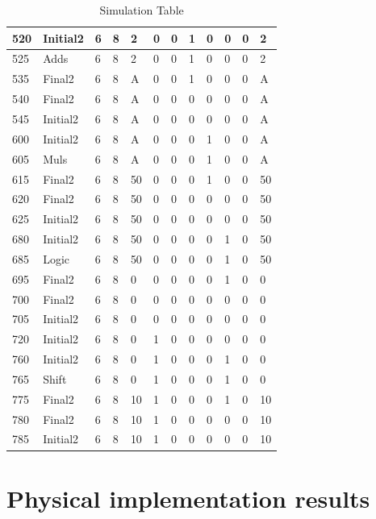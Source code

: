 \documentclass[12pt]{article}
\begin{document}
\begin{table}[]
\begin{tabular}{|l|l|l|l|l|l|l|l|l|l|l|l|}
        \hline
        520 & Initial2 & 6 & 8&2&0&0&1&0&0&0&2\\
        \hline
        525 & Adds& 6 & 8&2&0&0&1&0&0&0&2\\
        \hline
        535 & Final2& 6 & 8&A&0&0&1&0&0&0&A\\
        \hline
        540 & Final2& 6 & 8&A&0&0&0&0&0&0&A\\
        \hline
        545 & Initial2& 6 & 8&A&0&0&0&0&0&0&A\\
        \hline
        600 & Initial2& 6 & 8&A&0&0&0&1&0&0&A\\
        \hline
        605 & Muls& 6 & 8&A&0&0&0&1&0&0&A\\
        \hline
        615 & Final2& 6 & 8&50&0&0&0&1&0&0&50\\
        \hline
        620 & Final2& 6 & 8&50&0&0&0&0&0&0&50\\
        \hline
        625 & Initial2& 6 & 8&50&0&0&0&0&0&0&50\\
        \hline
        680 & Initial2& 6 & 8&50&0&0&0&0&1&0&50\\
        \hline
        685 & Logic& 6 & 8&50&0&0&0&0&1&0&50\\
        \hline
        695 & Final2& 6 & 8&0&0&0&0&0&1&0&0\\
        \hline
        700 & Final2& 6 & 8&0&0&0&0&0&0&0&0\\
        \hline
        705 & Initial2& 6 & 8&0&0&0&0&0&0&0&0\\
        \hline
        720 & Initial2& 6 & 8&0&1&0&0&0&0&0&0\\
        \hline
        760 & Initial2& 6 & 8&0&1&0&0&0&1&0&0\\
        \hline
        765 & Shift& 6 & 8&0&1&0&0&0&1&0&0\\
        \hline
        775 & Final2& 6 & 8&10&1&0&0&0&1&0&10\\
        \hline
        780 & Final2& 6 & 8&10&1&0&0&0&0&0&10\\
        \hline
        785 & Initial2& 6 & 8&10&1&0&0&0&0&0&10\\
        \hline
        
    \end{tabular}
    \caption{Simulation Table}
    \label{tab:simulation}
     
\end{table}



\section{Physical implementation results}
\end{document}
